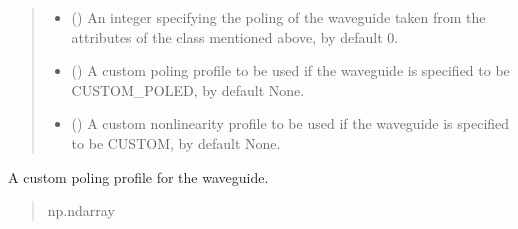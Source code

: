 \documentclass[a4paper,10pt,english]{sphinxmanual}
\begin{document}
\begin{fulllineitems}
\begin{quote}
\begin{description}
\begin{itemize}
\item {} 
\sphinxAtStartPar
{} (\sphinxstyleliteralemphasis{\sphinxupquote{, }}) \textendash{} An integer specifying the poling of the waveguide taken from the attributes of the class mentioned above, by default 0.

\item {} 
\sphinxAtStartPar
{} (\sphinxstyleliteralemphasis{\sphinxupquote{, }}) \textendash{} A custom poling profile to be used if the waveguide is specified to be CUSTOM\_POLED, by default None.

\item {} 
\sphinxAtStartPar
{} (\sphinxstyleliteralemphasis{\sphinxupquote{, }}) \textendash{} A custom nonlinearity profile to be used if the waveguide is specified to be CUSTOM, by default None.

\end{itemize}

\end{description}\end{quote}

\begin{fulllineitems}
\label{\detokenize{waveguide:pyjsa.waveguide.Waveguide.custom__poling_profile}}
\pysigstartsignatures
{}
\pysigstopsignatures
\sphinxAtStartPar
A custom poling profile for the waveguide.
\begin{quote}\begin{description}
\sphinxAtStartPar
np.ndarray

\end{description}\end{quote}

\end{fulllineitems}



\end{fulllineitems}
\end{document}
